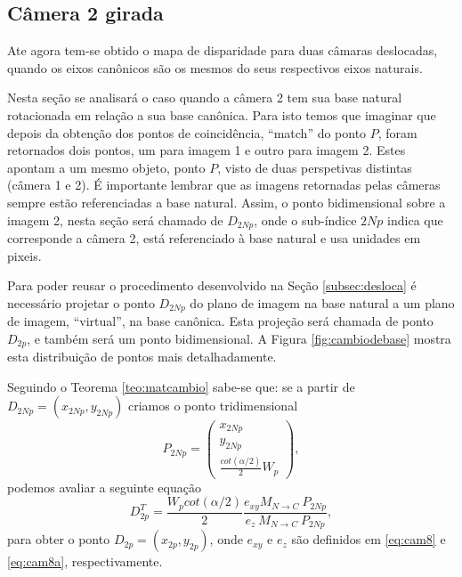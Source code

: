\documentclass[a4paper,10pt]{article}
\begin{document}
\subsection{Câmera 2 girada} \label{subsec:gira}
Ate agora tem-se obtido o mapa de disparidade para duas câmaras deslocadas,
quando os eixos canônicos são os mesmos do seus respectivos eixos naturais. 

Nesta seção se analisará o caso quando a câmera 2 tem sua base natural rotacionada em relação a sua base canônica.
Para isto temos que imaginar que depois da obtenção dos pontos de coincidência, ``match'' do ponto $P$,
foram retornados dois pontos, um para imagem 1 e outro para imagem 2. Estes apontam a um mesmo
objeto, ponto $P$, visto de duas perspetivas distintas (câmera 1 e 2). 
É importante lembrar que as imagens retornadas pelas câmeras sempre estão referenciadas a base natural.
Assim, o ponto bidimensional sobre a imagem 2, nesta seção será chamado de $D_{2Np}$, 
onde o sub-índice $2Np$ indica que corresponde a câmera 2,
está referenciado à base natural e usa unidades em pixeis.

Para poder reusar o procedimento desenvolvido na Seção \ref{subsec:desloca} é necessário projetar
o ponto $D_{2Np}$ do plano de imagem na base natural a um plano de imagem, ``virtual'', na base canônica.
Esta projeção será chamada de ponto $D_{2p}$, e também será um ponto bidimensional.
A Figura \ref{fig:cambiodebase} mostra esta distribuição de pontos mais detalhadamente.

Seguindo o Teorema \ref{teo:matcambio} sabe-se que: se a partir de $D_{2Np}=(x_{2Np},y_{2Np})$
criamos o ponto tridimensional
\begin{equation}\label{eq:girac1}
 P_{2Np}=\left(
 \begin{matrix}
  x_{2Np}\\
  y_{2Np}\\
  \frac{cot(\alpha/2)}{2}{W_p}
 \end{matrix}
 \right),
\end{equation}
podemos avaliar a seguinte equação
\begin{equation}\label{eq:girac2}
 D^T_{2p}=\frac{W_p cot(\alpha/2)}{2 }\frac{e_{xy} M_{N \rightarrow C}~P_{2Np} }{ {e_z~M_{N \rightarrow C}~P_{2Np}}},
\end{equation}
para obter o ponto $D_{2p}=(x_{2p},y_{2p})$, onde $e_{xy}$ e $e_z$ são definidos em \eqref{eq:cam8} e \eqref{eq:cam8a}, respectivamente.
\end{document}
